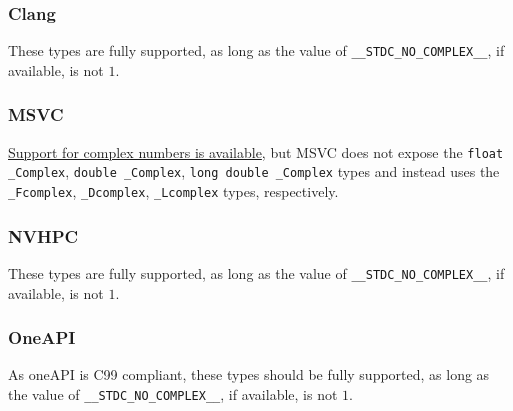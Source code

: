 \documentclass[../HDF5_RFC.tex]{subfiles}
\begin{document}
\subsubsection{Clang}

These types are fully supported, as long as the value of \texttt{\_\_STDC\_NO\_COMPLEX\_\_},
if available, is not $1$.

\subsubsection{MSVC}

\href{https://learn.microsoft.com/en-us/cpp/c-runtime-library/complex-math-support?view=msvc-170}{Support for complex numbers is available},
but MSVC does not expose the \texttt{float \_Complex}, \texttt{double \_Complex}, \texttt{long double \_Complex} types and instead uses
the \texttt{\_Fcomplex}, \texttt{\_Dcomplex}, \texttt{\_Lcomplex} types, respectively.

\subsubsection{NVHPC}

These types are fully supported, as long as the value of \texttt{\_\_STDC\_NO\_COMPLEX\_\_},
if available, is not $1$.

\subsubsection{OneAPI}

As oneAPI is C99 compliant, these types should be fully supported, as long as the value of
\texttt{\_\_STDC\_NO\_COMPLEX\_\_}, if available, is not $1$.
\end{document}
